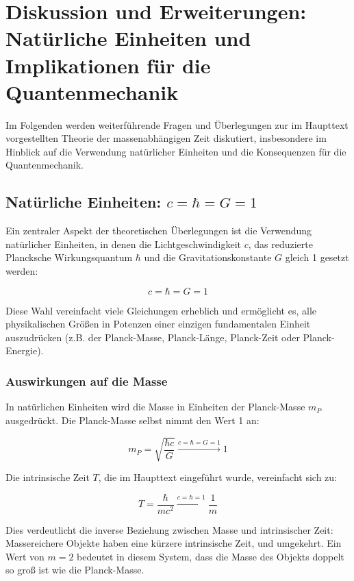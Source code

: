 \appendix
\section{Diskussion und Erweiterungen: Natürliche Einheiten und Implikationen für die Quantenmechanik}

Im Folgenden werden weiterführende Fragen und Überlegungen zur im Haupttext vorgestellten Theorie der massenabhängigen Zeit diskutiert, insbesondere im Hinblick auf die Verwendung natürlicher Einheiten und die Konsequenzen für die Quantenmechanik.

\subsection{Natürliche Einheiten: $c = \hbar = G = 1$}

Ein zentraler Aspekt der theoretischen Überlegungen ist die Verwendung natürlicher Einheiten, in denen die Lichtgeschwindigkeit $c$, das reduzierte Plancksche Wirkungsquantum $\hbar$ und die Gravitationskonstante $G$ gleich 1 gesetzt werden:

\begin{equation}
	c = \hbar = G = 1
\end{equation}

Diese Wahl vereinfacht viele Gleichungen erheblich und ermöglicht es, alle physikalischen Größen in Potenzen einer einzigen fundamentalen Einheit auszudrücken (z.B. der Planck-Masse, Planck-Länge, Planck-Zeit oder Planck-Energie).

\subsubsection{Auswirkungen auf die Masse}

In natürlichen Einheiten wird die Masse in Einheiten der Planck-Masse $m_P$ ausgedrückt. Die Planck-Masse selbst nimmt den Wert 1 an:

\begin{equation}
	m_P = \sqrt{\frac{\hbar c}{G}} \xrightarrow{c=\hbar=G=1} 1
\end{equation}

Die intrinsische Zeit $T$, die im Haupttext eingeführt wurde, vereinfacht sich zu:

\begin{equation}
	T = \frac{\hbar}{mc^2} \xrightarrow{c=\hbar=1} \frac{1}{m}
\end{equation}

Dies verdeutlicht die inverse Beziehung zwischen Masse und intrinsischer Zeit: Massereichere Objekte haben eine kürzere intrinsische Zeit, und umgekehrt.  Ein Wert von $m = 2$ bedeutet in diesem System, dass die Masse des Objekts doppelt so groß ist wie die Planck-Masse.

